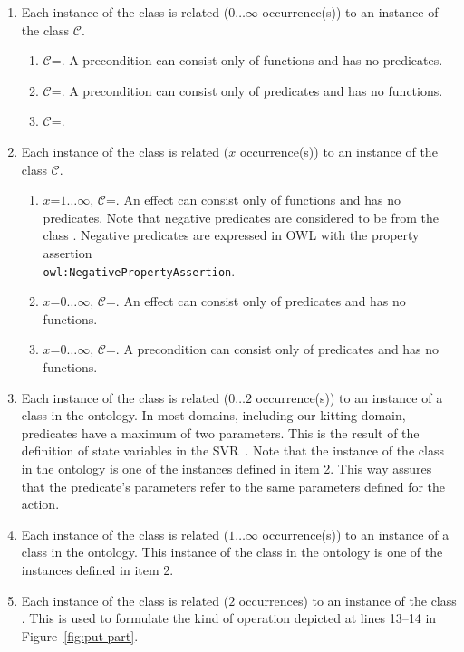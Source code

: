 \begin{enumerate}
  \item Each instance of the class  is related ($0\ldots\infty$ occurrence(s)) to an instance of the class $\mathcal{C}$.
    \begin{enumerate}
      \item $\mathcal{C}$=. A precondition can consist only of functions and has no predicates.
       \item $\mathcal{C}$=. A precondition can consist only of predicates and has no functions.
       \item $\mathcal{C}$=.
    \end{enumerate}
    \item Each instance of the class  is related ($x$ occurrence(s)) to an instance of the class $\mathcal{C}$.
    \begin{enumerate}
      \item $x$=$1\ldots\infty$, $\mathcal{C}$=. An effect can consist only of functions and has no predicates. Note that negative predicates are considered to be from the class . Negative predicates are expressed in OWL with the property assertion\\\texttt{owl:NegativePropertyAssertion}.
       \item $x$=$0\ldots\infty$, $\mathcal{C}$=. An effect can consist only of predicates and has no functions.
       \item $x$=$0\ldots\infty$, $\mathcal{C}$=. A precondition can consist only of predicates and has no functions.
    \end{enumerate}
  \item Each instance of the class  is related ($0\ldots2$ occurrence(s)) to an instance of a class in the  ontology. In most domains, including our kitting domain, predicates have a maximum of two parameters. This is the result of the definition of state variables in the SVR~\cite{BALAKIRSKY.IROS.2012}. Note that the instance of the class in the  ontology is one of the instances defined in item 2. This way assures that the predicate's parameters refer to the same parameters defined for the action.
  \item Each instance of the class  is related ($1\ldots\infty$ occurrence(s)) to an instance of a class in the  ontology. This instance of the class in the  ontology is one of the instances defined in item 2.
    \item Each instance of the class  is related ($2$ occurrences) to an instance of the class . This is used to formulate the kind of operation depicted at lines 13--14 in Figure~\ref{fig:put-part}.
\end{enumerate}


